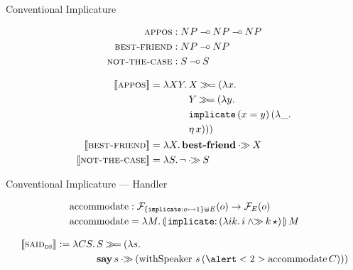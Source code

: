 \documentclass{beamer}
\begin{document}
\begin{frame}{Conventional Implicature}

\begin{align*}
  \textsc{appos} &: NP \mathbin{{-}\mkern-3.5mu{\circ}} NP \mathbin{{-}\mkern-3.5mu{\circ}} NP \\
  \textsc{best-friend} &: NP \mathbin{{-}\mkern-3.5mu{\circ}} NP \\
  \textsc{not-the-case} &: S \mathbin{{-}\mkern-3.5mu{\circ}} S
\end{align*}

\begin{align*}
  \llbracket \textsc{appos} \rrbracket &= \lambda X Y.\, \begin{aligned}[t]
        &X \mathbin{\gg\!=} (\lambda x.\,  \\
        &Y \mathbin{\gg\!=} (\lambda y.\,  \\
        &\mathtt{implicate}\,(x = y)\,(\lambda \_.\,  \\
        &\eta\,x)))
      \end{aligned} \\
  \llbracket \textsc{best-friend} \rrbracket &= \lambda X.\, \textbf{best-friend} \mathbin{\cdot\!\!\gg} X \\
  \llbracket \textsc{not-the-case} \rrbracket &= \lambda S.\, \lnot \mathbin{\cdot\!\!\gg} S
\end{align*}
\end{frame}


\begin{frame}{Conventional Implicature --- Handler}
  
\begin{align*}
  \accommodate &: \FF_{\{\typedop{implicate}{o}{1}\} \uplus E}(o) \to \FF_E(o) \\
  \accommodate &= \lam{M}{\ap{\banana{\onto{\op{implicate}}{(\lam{i k}{i \andr \ap{k}{\star}})}}}{M}}
\end{align*}

\pause
\begin{align*}
  \sem{\abs{said}_{\abs{ds}}} := \lam{C S}{
    &S \hsbind (\lam{s}{ \\
    &\ap{\obj{say}}{s} \apr (\app{\withSpeaker}{s}{(\ap{\alert<2>{\accommodate}}{C})})})}
\end{align*}
\end{frame}
\end{document}
